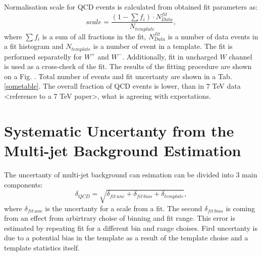 Normalisation scale for QCD events is calculated from obtained fit parameters as:
\begin{equation}
scale = \frac{(1-\sum f_i) \cdot N^{fit}_{Data}}{N_{template}},
\end{equation}
where $\sum f_i$ is a sum of all fractions in the fit, $N^{fit}_{Data}$ is a number of data events in a fit histogram and $N_{template}$ is a number of event in a template. The fit is performed separatelly for $W^{+}$ and $W^{-}$. Additionally, fit in uncharged $W$ channel is used as a cross-check of the fit. The results of the fitting procedure are shown on a Fig. . Total number of events and fit uncertanty are shown in a Tab. \ref{sometable}. The overall fraction of QCD events is lower, than in 7 TeV data <reference to a 7 TeV paper>, what is agreeing with expectations. 

\section{Systematic Uncertanty from the Multi-jet Background Estimation}
The uncertanty of multi-jet background can esimation can be divided into 3 main components:
\begin{equation}
\delta_{QCD} = \sqrt{ \delta_{fit\, unc}+\delta_{fit\, bias}+\delta_{template}}, 
\end{equation}
where $\delta_{fit\, unc}$ is the uncertanty for a scale from a \chiD fit. The second $\delta_{fit\, bias}$ is coming from an effect from arbirtrary choise of binning and fit range. This error is estimated by repeating fit for a different bin and range choises. Fird uncertanty is due to a potential bias in the template as a result of the template choise and a template statistics itself. 